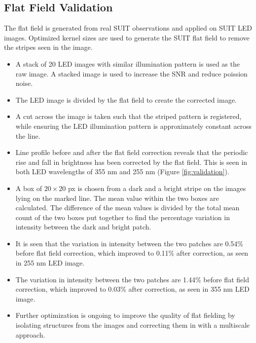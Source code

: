 \documentclass[11pt,a4paper]{article}
\begin{document}
	\subsection{Flat Field Validation}
		The flat field is generated from real SUIT observations and applied on SUIT LED images. Optimized kernel sizes are used to generate the SUIT flat field to remove the stripes seen in the image.
	\begin{itemize}
		\item A stack of 20 LED images with similar illumination pattern is used as the raw image. A stacked image is used to increase the SNR and reduce poission noise.
		\item The LED image is divided by the flat field to create the corrected image.
		\item A cut across the image is taken such that the striped pattern is registered, while ensuring the LED illumination pattern is approximately constant across the line.
		\item Line profile before and after the flat field correction reveals that the periodic rise and fall in brightness has been corrected by the flat field. This is seen in both LED wavelengths of 355 nm and 255 nm (Figure \ref{fig:validation}).
		\item A  box of $20 \times 20$ px is chosen from a dark and a bright stripe on the images lying on the marked line. The mean value within the two boxes are calculated. The difference of the mean values is divided by the total mean count of the two boxes put together to find the percentage variation in intensity between the dark and bright patch.
		\item It is seen that the variation in intensity between the two patches are 0.54\% before flat field correction, which improved to 0.11\% after correction, as seen in 255 nm LED image.
		\item The variation in intensity between the two patches are 1.44\% before flat field correction, which improved to 0.03\% after correction, as seen in 355 nm LED image.
		\item Further optimization is ongoing to improve the quality of flat fielding by isolating structures from the images and correcting them in with a multiscale approach.
	\end{itemize}
	
\end{document}
